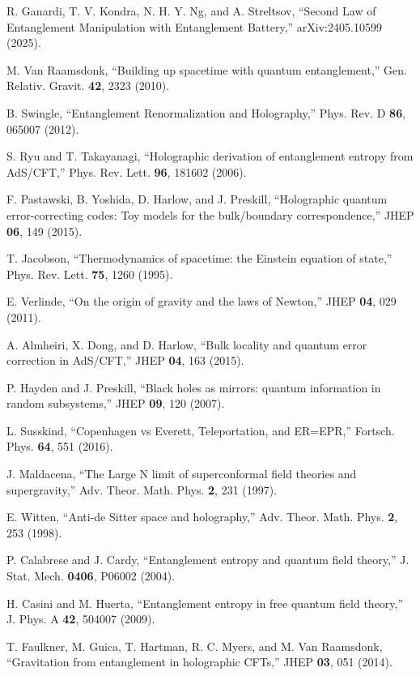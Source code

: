 \documentclass[twocolumn,showpacs,preprintnumbers,amsmath,amssymb,aps]{revtex4-1}
\begin{document}
\begin{thebibliography}{99}

R. Ganardi, T. V. Kondra, N. H. Y. Ng, and A. Streltsov,
``Second Law of Entanglement Manipulation with Entanglement Battery,''
arXiv:2405.10599 (2025).

M. Van Raamsdonk,
``Building up spacetime with quantum entanglement,''
Gen. Relativ. Gravit. \textbf{42}, 2323 (2010).

B. Swingle,
``Entanglement Renormalization and Holography,''
Phys. Rev. D \textbf{86}, 065007 (2012).

S. Ryu and T. Takayanagi,
``Holographic derivation of entanglement entropy from AdS/CFT,''
Phys. Rev. Lett. \textbf{96}, 181602 (2006).

F. Pastawski, B. Yoshida, D. Harlow, and J. Preskill,
``Holographic quantum error-correcting codes: Toy models for the bulk/boundary correspondence,''
JHEP \textbf{06}, 149 (2015).

T. Jacobson,
``Thermodynamics of spacetime: the Einstein equation of state,''
Phys. Rev. Lett. \textbf{75}, 1260 (1995).

E. Verlinde,
``On the origin of gravity and the laws of Newton,''
JHEP \textbf{04}, 029 (2011).

A. Almheiri, X. Dong, and D. Harlow,
``Bulk locality and quantum error correction in AdS/CFT,''
JHEP \textbf{04}, 163 (2015).

P. Hayden and J. Preskill,
``Black holes as mirrors: quantum information in random subsystems,''
JHEP \textbf{09}, 120 (2007).

L. Susskind,
``Copenhagen vs Everett, Teleportation, and ER=EPR,''
Fortsch. Phys. \textbf{64}, 551 (2016).

J. Maldacena,
``The Large N limit of superconformal field theories and supergravity,''
Adv. Theor. Math. Phys. \textbf{2}, 231 (1997).

E. Witten,
``Anti-de Sitter space and holography,''
Adv. Theor. Math. Phys. \textbf{2}, 253 (1998).

P. Calabrese and J. Cardy,
``Entanglement entropy and quantum field theory,''
J. Stat. Mech. \textbf{0406}, P06002 (2004).

H. Casini and M. Huerta,
``Entanglement entropy in free quantum field theory,''
J. Phys. A \textbf{42}, 504007 (2009).

T. Faulkner, M. Guica, T. Hartman, R. C. Myers, and M. Van Raamsdonk,
``Gravitation from entanglement in holographic CFTs,''
JHEP \textbf{03}, 051 (2014).

\end{thebibliography}
\end{document}
